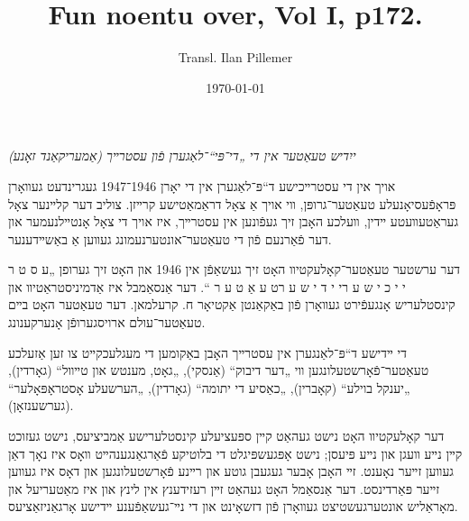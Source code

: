 \documentclass{article}
\begin{document}
\renewcommand{\abstractname}{\vspace{-\baselineskip}}
\title{Fun noentu over, Vol I, p172.}
\author{Transl. Ilan Pillemer}
\date{\today}

\maketitle



\begin{pairs}

\begin{Rightside}

\begin{RTL}
\begin{hebrew}
\beginnumbering
\autopar
\emph{
ייִדיש טעאַטער אין די „די־פּי“־לאַגערן פֿון עסטרײך (אַמעריקאַנד זאָנע)
}
\newline

אויך אין די עסטרײכישע ד“פּ־לאַגערן אין די יאָרן 1946־1947
געגרינדעט געװאָרן פּראָפֿעסיאָנעלע טעאַטער־גרופּן, װי אויך אַ צאָל דראַמאַטישע קרײזן.
 צוליב דער קלײנער צאָל געראַטעװעטע ײדין, װעלכע האָבן זיך געפֿונען אין עסטרײך, איז אויך די צאָל אָנטײלנעמער און
 דער פֿאַרנעם פֿון די טעאַטער־אונטערנעמונג געװען אַ באַשײדענער.

דער ערשטער טעאַטער־קאָלעקטיװ האָט זיך געשאַפֿן אין 1946 און האָט זיך גערופן „ע ס ט ר י י כ י ש ע ר\space\space  י י ד י ש ע ר\space\space  ט ע אַ ט ע ר “.
דער אַנסאַמבל איז אַדמיניסטראַטיװ און קינסטלעריש אָנגעפֿירט געװאָרן פֿון באַקאַנטן אַקטיאָר ח. קרעלמאן. 
דער טעאַטער האָט בײם טעאַטער־עולם ארויסגערופֿן אָנערקענונג.

די ײדישע ד“פּ־לאַנגערן אין עסטרײך האָבן באַקומען די מעגלעכקײט צו זען אַזעלכע טעאַטער־פֿאָרשטעלונגען װי „דער דיבוק“ (אַנסקי),
„גאָט, מענטש און טײװל“ (גאָרדין), „יענקל בוילע“ (קאָברין), „כאַסיע די יתומה“ (גאָרדין),
„הערשעלע אָסטראָפּאָלער“ (גערשענזאָן).

דער קאָלעקטיװ האָט נישט געהאַט קײן ספּעציעלע קינסטלערישע אַמביציעס, נישט געזוכט קײן נײע װעגן און נײע פּיעסן;
נישט אָפּגעשפּיגלט די בלוטיקע פֿאַרגאַנגענהײט װאָס איז נאָך דאַן געװען זײער נאָענט.
זײ האָבן אָבער געגעבן גוטע און רײנע פֿאָרשטעלונגען און דאָס איז געװען זײער פּאַרדינסט.
דער אַנסאַמל האָט געהאַט זײן רעזידענץ אין לינץ און איז מאַטעריעל
און מאָראַליש אונטערגעשטיצט געװאָרן פֿון דזשאָינט און די
נײ־געשאַפֿענע ײדישע אָרגאַניזאַציעס.

\endnumbering
\end{hebrew}
\end{RTL}
\end{Rightside}



\end{pairs}
\end{document}

